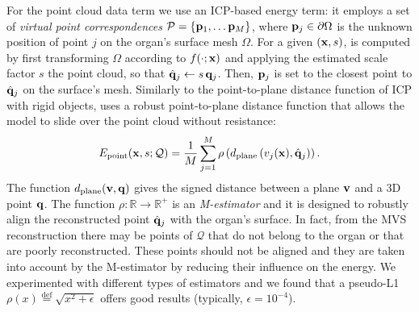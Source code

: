 For the point cloud data term \Epoint we use an ICP-based energy term: it employs a set of \emph{virtual point correspondences} $\mathcal{P}=\{\mathbf{p}_1,\dots \mathbf{p}_M\}$, where $\mathbf{p}_j\in\partial \Omega$ is the unknown position of point $j$ on the organ's surface mesh $\Omega$. 
For a given $(\mathbf{x},s)$, \Epoint is computed by first transforming $\Omega$ according to $f(\cdot;\mathbf{x})$ and applying the estimated scale factor $s$ the point cloud, so that $\hat{\mathbf{q}}_{j}\gets s\,\mathbf{q}_{j}$.
Then, $\mathbf{p}_j$ is set to the closest point to $\hat{\mathbf{q}}_{j}$ on the surface's mesh.
Similarly to the point-to-plane distance function of ICP with rigid objects, \Epoint uses a robust point-to-plane distance function that allows the model to slide over the point cloud without resistance:
\begin{equation}
E_{\text{point}}(\mathbf{x},s;\mathcal{Q})=\frac{1}{M}\sum_{j=1}^{M}\rho\left(d_{\text{plane}}\left(v_{j}(\mathbf{x}),\hat{\mathbf{q}}_{j}\right)\right).
\end{equation}
\noindent The function $d_{\text{plane}}(\mathbf{v},\mathbf{q})$ gives the signed distance between a plane $\mathbf{v}$ and a 3D point $\mathbf{q}$.
The function $\rho:\mathbb{R}\rightarrow\mathbb{R}^{+}$ is an \emph{M-estimator} and it is designed to robustly align the reconstructed point $\hat{\mathbf{q}}_{j}$ with the organ's surface. 
In fact, from the MVS reconstruction there may be points of $\mathcal{Q}$ that do not belong to the organ or that are poorly reconstructed.
These points should not be aligned and they are taken into account by the M-estimator by reducing their influence on the energy.
We experimented with different types of estimators and we found that a pseudo-L1 $\rho({x})\overset{\mathrm{def}}{=}\sqrt{{x}^{2}+\epsilon}$ offers good results (typically, $\epsilon = 10^{-4}$).

